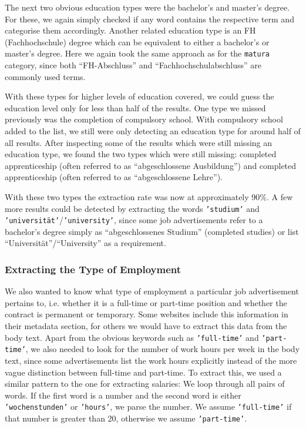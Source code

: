 \documentclass[runningheads]{llncs}
\begin{document}
The next two obvious education types were the bachelor's and master's degree. For these, we again simply checked if any word contains the respective term and categorise them accordingly. Another related education type is an FH (Fachhochschule) degree which can be equivalent to either a bachelor's or master's degree. Here we again took the same approach as for the \texttt{matura} category, since both “FH-Abschluss” and “Fachhochschulabschluss” are commonly used terms.

With these types for higher levels of education covered, we could guess the education level only for less than half of the results. One type we missed previously was the completion of compulsory school. With compulsory school added to the list, we still were only detecting an education type for around half of all results. After inspecting some of the results which were still missing an education type, we found the two types which were still missing: completed apprenticeship (often referred to as “abgeschlossene Ausbildung”) and completed apprenticeship (often referred to as “abgeschlossene Lehre”).

With these two types the extraction rate was now at approximately 90\%. A few more results could be detected by extracting the words \texttt{'studium'} and \texttt{'universität'}/\texttt{'university'}, since some job advertisements refer to a bachelor's degree simply as “abgeschlossenes Studium” (completed studies) or list “Universität”/“University” as a requirement.


\subsubsection{Extracting the Type of Employment}
\label{subsub:extracting_the_type_of_employment}

We also wanted to know what type of employment a particular job advertisement pertains to, i.e. whether it is a full-time or part-time position and whether the contract is permanent or temporary. Some websites include this information in their metadata section, for others we would have to extract this data from the body text. Apart from the obvious keywords such as \texttt{'full-time'} and \texttt{'part-time'}, we also needed to look for the number of work hours per week in the body text, since some advertisements list the work hours explicitly instead of the more vague distinction between full-time and part-time. To extract this, we used a similar pattern to the one for extracting salaries: We loop through all pairs of words. If the first word is a number and the second word is either \texttt{'wochenstunden'} or \texttt{'hours'}, we parse the number. We assume \texttt{'full-time'} if that number is greater than 20, otherwise we assume \texttt{'part-time'}.
\end{document}
